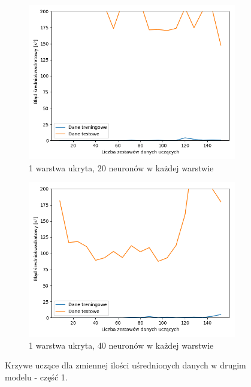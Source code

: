 \documentclass[12pt]{aghdpl}
\begin{document}
		\begin{figure}[h]
			\centering
			\begin{subfigure}{.8\linewidth}
		 		\includegraphics[width =\linewidth]{wykresy/5_usrednianie_danych/1_warstwa_20_neuronow_learning_curves.png}
		 		\caption{1 warstwa ukryta, 20 neuronów w każdej warstwie}
		 	\end{subfigure}
		 	\begin{subfigure}{.8\linewidth}
		 		\includegraphics[width =\linewidth]{wykresy/5_usrednianie_danych/1_warstwa_40_neuronow_learning_curves.png}
		 		\caption{1 warstwa ukryta, 40 neuronów w każdej warstwie}
		 	\end{subfigure}
		 	
		 	 \caption{Krzywe uczące dla zmiennej ilości uśrednionych danych w drugim modelu - część 1.}
			\label{fig: drugi_model_przy_usrednionych_danych_learning_curves_1}
		\end{figure}
		 	
\end{document}
